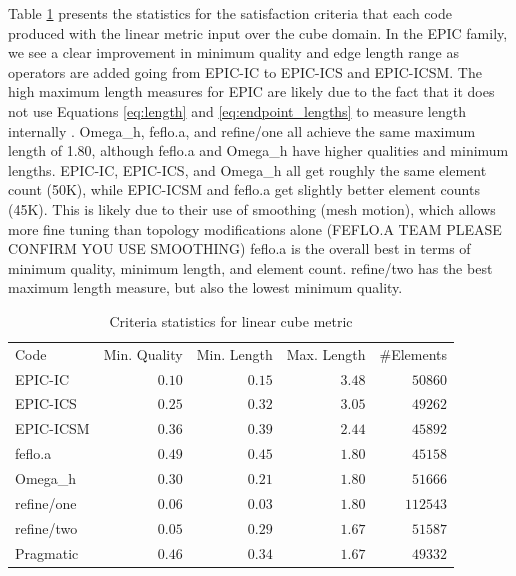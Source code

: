 \documentclass[3p,times,procedia,number]{elsarticle}
\begin{document}
Table \ref{tab:cube-linear-stats} presents the statistics
for the satisfaction criteria that each code
produced with the linear metric input over the cube domain.
In the EPIC family, we see a clear improvement in minimum
quality and edge length range as operators are added
going from EPIC-IC to EPIC-ICS and EPIC-ICSM.
The high maximum length measures for EPIC are likely due
to the fact that it does not use Equations \ref{eq:length}
and \ref{eq:endpoint_lengths} to measure length
internally \cite{park-loseille-krakos-michal-adapt-decomposition}.
Omega\_h, feflo.a, and refine/one
all achieve the same maximum length of 1.80, although
feflo.a and Omega\_h have higher qualities
and minimum lengths.
EPIC-IC, EPIC-ICS, and Omega\_h all get roughly
the same element count (50K), while EPIC-ICSM and feflo.a
get slightly better element counts (45K).
This is likely due to their use of smoothing (mesh motion),
which allows more fine tuning than topology modifications alone
(FEFLO.A TEAM PLEASE CONFIRM YOU USE SMOOTHING)
feflo.a is the overall best in terms of minimum
quality, 
minimum length, and element count.
refine/two has the best maximum length measure,
but also the lowest minimum quality.

\begin{table}
\caption{Criteria statistics for linear cube metric}
\label{tab:cube-linear-stats}
\begin{tabular}{lrrrr}
Code & Min. Quality & Min. Length & Max. Length & \#Elements\\
EPIC-IC     & $0.10$&       $0.15$&       $3.48$&   $ 50860$\\
EPIC-ICS    & $0.25$&       $0.32$&       $3.05$&   $ 49262$\\
EPIC-ICSM   & $0.36$&       $0.39$&       $2.44$&   $ 45892$\\
feflo.a     & $0.49$&       $0.45$&       $1.80$&   $ 45158$\\
Omega\_h    & $0.30$&       $0.21$&       $1.80$&   $ 51666$\\
refine/one  & $0.06$&       $0.03$&       $1.80$&   $112543$\\
refine/two  & $0.05$&       $0.29$&       $1.67$&   $ 51587$\\
Pragmatic   & $0.46$&       $0.34$&       $1.67$&   $ 49332$\\
\end{tabular}
\end{table}
\end{document}
